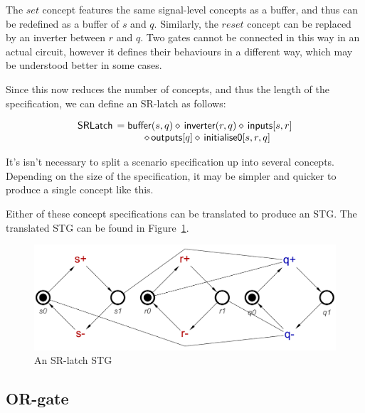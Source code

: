 \documentclass[british, journal]{IEEEtran}
\begin{document}
The $set$ concept features the same signal-level concepts as a buffer, and thus can be redefined
as a buffer of $s$ and $q$. Similarly, the $reset$ concept can be replaced by an inverter between
$r$ and $q$. Two gates cannot be connected in this way in an actual circuit, however
it defines their behaviours in a different way, which may be understood better in some cases.

Since this now reduces the number of concepts, and thus the length of the specification, we
can define an SR-latch as follows:

 \[
\begin{array}{lcl}
\mathsf{SRLatch}&\hspace{-2mm}=\mathsf{buffer}(s, q) \diamond\, \mathsf{inverter}(r, q) \diamond\, \mathsf{inputs}[s, r]\\ 
&\diamond\, \mathsf{outputs}[q] \diamond\, \mathsf{initialise0} [s, r, q]
\end{array}
\]

It's isn't necessary to split a scenario specification up into several concepts. 
Depending on the size of the specification, it may be simpler and quicker to 
produce a single concept like this.

Either of these concept specifications can be translated to produce an STG. 
The translated STG can be found in Figure~\ref{fig:sr-latch-stg}.

\vspace{-3mm}

\begin{figure}[h]
\begin{centering}
\includegraphics[scale=0.32]{Images/sr-latch-stg}
\par\end{centering}
\vspace{-1mm}
\protect\caption{\label{fig:sr-latch-stg} An SR-latch STG}
\vspace{-5mm}
\end{figure}

\vspace{-5mm}
\subsection{OR-gate}
\end{document}
